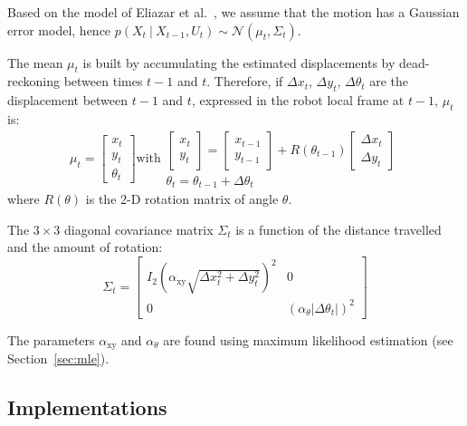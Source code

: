 \documentclass[letterpaper, 10pt, conference]{ieeeconf}
\newcommand{\sect}[1]{Section~\ref{sec:#1}}
\begin{document}
Based on the model of Eliazar et al.~\cite{eliazar2004motionmodel}, we assume that the motion has a Gaussian error model, hence $p(X_t~|~X_{t-1}, U_{t})\sim\mathcal{N}(\mu_t,\Sigma_t)$.

The mean $\mu_t$ is built by accumulating the estimated displacements by dead-reckoning between times $t-1$ and $t$.
Therefore, if $\Delta x_t$, $\Delta y_t$, $\Delta \theta_t$ are the displacement between $t-1$ and $t$, expressed in the robot local frame at $t-1$, $\mu_t$ is:
\begin{equation}
\mu_t =
\left[ \begin{array}{c} x_t \\ y_t \\ \theta_t \end{array} \right]
\text{with}
\begin{array}{c}
\left[ \begin{array}{c} x_t \\ y_t \end{array} \right] =
\left[ \begin{array}{c} x_{t-1} \\ y_{t-1} \end{array} \right] +
R(\theta_{t-1})
\left[ \begin{array}{c} \Delta x_{t} \\ \Delta y_{t} \end{array} \right]
\\
\theta_t = \theta_{t-1} + \Delta \theta_t
\end{array}
\end{equation}
where $R(\theta)$ is the 2-D rotation matrix of angle $\theta$.

The $3\times3$ diagonal covariance matrix $\Sigma_t$ is a function of the distance travelled and the amount of rotation:
\begin{equation}
\Sigma_t=\begin{bmatrix} I_2 ( \alpha_\mathrm{xy} \sqrt{\Delta x_{t}^2 + \Delta y_{t}^2})^2  & 0 \\ 0 & (\alpha_\theta | \Delta \theta_t |)^2 \end{bmatrix}
\end{equation}


The parameters $\alpha_\mathrm{xy}$ and $\alpha_\theta$ are found using maximum likelihood estimation (see \sect{mle}).

\subsection{Implementations}
\end{document}

